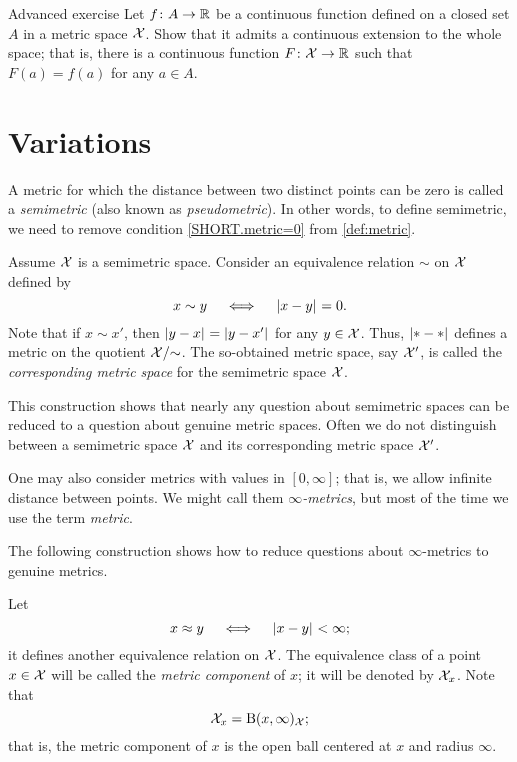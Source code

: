 \begin{thm}{Advanced exercise}\label{ex:tietze}
Let $f\colon A\to\mathbb{R}$ be a continuous function defined on a closed set $A$ in a metric space $\mathcal{X}$.
Show that it admits a continuous extension to the whole space;
that is, there is a continuous function $F\colon\mathcal{X}\to\mathbb{R}$ such that $F(a)=f(a)$ for any $a\in A$.
\end{thm}



\section{Variations}

A metric for which the distance between two distinct points can be zero is called a \emph{semimetric} (also known as \emph{pseudometric}).
In other words, to define semimetric, we need to remove condition \ref{SHORT.metric=0} from \ref{def:metric}.

Assume $\mathcal{X}$ is a semimetric space.
Consider an equivalence relation $\sim$ on $\mathcal{X}$ defined by
\[x\sim y\quad\iff\quad\dist{x}{y}{}=0.\] 
Note that if $x\sim x'$, then $\dist{y}{x}{}=\dist{y}{x'}{}$ for any $y\in\mathcal{X}$.
Thus, $\dist{*}{*}{}$ defines a metric on the
quotient $\mathcal{X}/{\sim}$.
The so-obtained metric space, say $\mathcal{X}'$, is called the 
\emph{corresponding metric space} for the semimetric space $\mathcal{X}$.
 

This construction shows that nearly any question about semimetric spaces can be reduced to a question about genuine metric spaces.
Often we do not distinguish between a semimetric space $\mathcal{X}$ and its corresponding metric space $\mathcal{X}'$.

One may also consider metrics with values in $[0,\infty]$;
that is, we allow infinite distance between points.
We might call them \emph{$\infty$-metrics}, but most of the time we use the term \textit{metric}.

The following construction shows how to reduce questions about $\infty$-metrics to genuine metrics. 

Let 
\[x\approx y\quad\iff\quad\dist{x}{y}{}<\infty;\]
it defines another equivalence relation on $\mathcal{X}$.
The equivalence class of a point $x\in\mathcal{X}$ will be called the \emph{metric component} 
 of $x$; it will be denoted by $\mathcal{X}_x$.
Note that 
\[\mathcal{X}_x=\mathrm{B}{}(x,\infty)_{\mathcal{X}};\]
that is, the metric component of $x$ is the open ball centered at $x$ and radius $\infty$.

